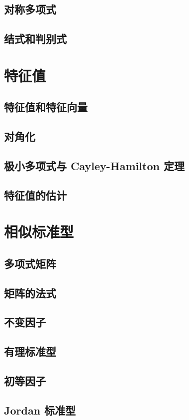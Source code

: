 \documentclass[a4paper, 11pt]{ctexbook}
\begin{document}
        \section{对称多项式}
        \section{结式和判别式}
    \chapter{特征值}
        \section{特征值和特征向量}
        \section{对角化}
        \section{极小多项式与 Cayley-Hamilton 定理}
        \section{特征值的估计}
    \chapter{相似标准型}
        \section{多项式矩阵}
        \section{矩阵的法式}
        \section{不变因子}
        \section{有理标准型}
        \section{初等因子}
        \section{Jordan 标准型}
\end{document}
